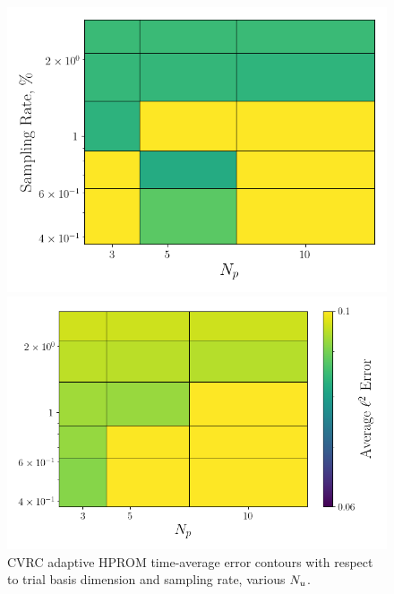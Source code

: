 \begin{figure}
	\begin{minipage}{0.46\linewidth}
		\includegraphics[width=0.99\linewidth]{Chapters/AdaptiveResults/Images/cvrc/errContours/err_contour_iter4.png}
	\end{minipage}
	\begin{minipage}{0.53\linewidth}
		\includegraphics[width=0.99\linewidth]{Chapters/AdaptiveResults/Images/cvrc/errContours/err_contour_iter5.png}
	\end{minipage}
	\caption{\label{fig:cvrcAdaptiveROMErrContour}CVRC adaptive HPROM time-average error contours with respect to trial basis dimension and sampling rate, various $N_u$.}
\end{figure}

